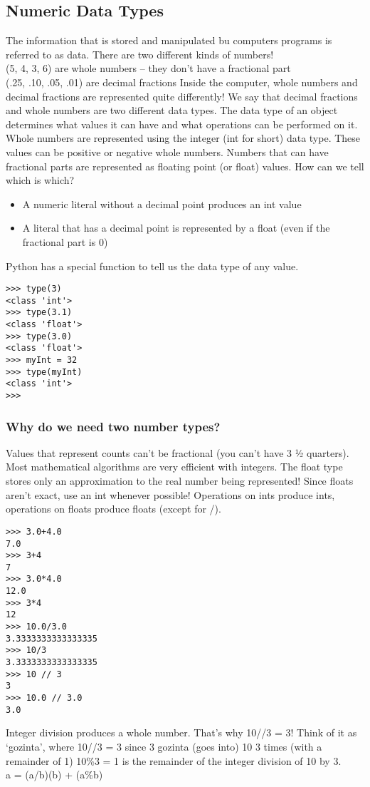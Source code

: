 \documentclass[12pt,a4paper,final,twoside,onecolumn,titlepage]{book}
\begin{document}
\subsection{Numeric Data Types}
The information that is stored and manipulated bu computers programs is referred to as data. There are two different kinds of numbers!
\\(5, 4, 3, 6) are whole numbers – they don’t have a fractional part
\\(.25, .10, .05, .01) are decimal fractions
Inside the computer, whole numbers and decimal fractions are represented quite differently! We say that decimal fractions and whole numbers are two different data types. The data type of an object determines what values it can have and what operations can be performed on it. Whole numbers are represented using the integer (int for short) data type. These values can be positive or negative whole numbers. Numbers that can have fractional parts are represented as floating point (or float) values.
How can we tell which is which?
\begin{itemize}
\item A numeric literal without a decimal point produces an int value
\item A literal that has a decimal point is represented by a float (even if the fractional part is 0)
\end{itemize}
Python has a special function to tell us the data type of any value.
\lstset{language=Python, tabsize=4}
\begin{lstlisting}
>>> type(3)
<class 'int'>
>>> type(3.1)
<class 'float'>
>>> type(3.0)
<class 'float'>
>>> myInt = 32
>>> type(myInt)
<class 'int'>
>>> 
\end{lstlisting}
\subsubsection{Why do we need two number types?}
Values that represent counts can’t be fractional (you can’t have 3 ½ quarters). Most mathematical algorithms are very efficient with integers. The float type stores only an approximation to the real number being represented! Since floats aren’t exact, use an int whenever possible! Operations on ints produce ints, operations on floats produce floats (except for /).
\lstset{language=Python, tabsize=4}
\begin{lstlisting}
>>> 3.0+4.0
7.0
>>> 3+4
7
>>> 3.0*4.0
12.0
>>> 3*4
12
>>> 10.0/3.0
3.3333333333333335
>>> 10/3
3.3333333333333335
>>> 10 // 3
3
>>> 10.0 // 3.0
3.0
\end{lstlisting}
Integer division produces a whole number. That’s why 10//3 = 3!
Think of it as ‘gozinta’, where 10//3 = 3 since 3 gozinta (goes into) 10 3 times (with a remainder of 1)
10\%3 = 1 is the remainder of the integer division of 10 by 3.
\\a = (a/b)(b) + (a\%b)
\end{document}
